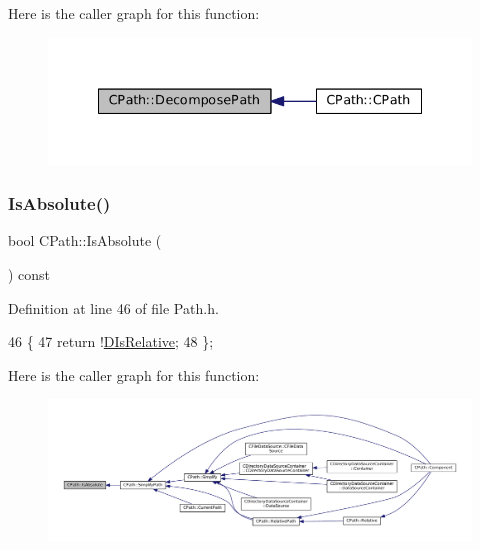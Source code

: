 Here is the caller graph for this function\+:
\nopagebreak
\begin{figure}[H]
\begin{center}
\leavevmode
\includegraphics[width=335pt]{classCPath_aae05f3c3502e92bf68d5ce71264c7bb9_icgraph}
\end{center}
\end{figure}
\hypertarget{classCPath_a613d8d4c4b72dba9fc8b6e487f583d7d}{}\label{classCPath_a613d8d4c4b72dba9fc8b6e487f583d7d} 
\subsubsection{\texorpdfstring{Is\+Absolute()}{IsAbsolute()}}
{\footnotesize\ttfamily bool C\+Path\+::\+Is\+Absolute (\begin{DoxyParamCaption}{ }\end{DoxyParamCaption}) const\hspace{0.3cm}{\ttfamily [inline]}}



Definition at line 46 of file Path.\+h.


\begin{DoxyCode}
46                                \{
47             \textcolor{keywordflow}{return} !\hyperlink{classCPath_af705ff149bb2281c67afb84fff550eb9}{DIsRelative};  
48         \};
\end{DoxyCode}
Here is the caller graph for this function\+:
\nopagebreak
\begin{figure}[H]
\begin{center}
\leavevmode
\includegraphics[width=350pt]{classCPath_a613d8d4c4b72dba9fc8b6e487f583d7d_icgraph}
\end{center}
\end{figure}
\hypertarget{classCPath_a59cf4c412366aef121fcbc97339ad13b}{}\label{classCPath_a59cf4c412366aef121fcbc97339ad13b} 
